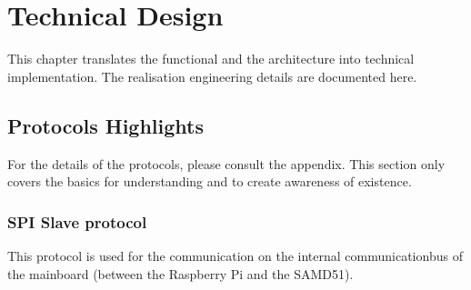 \chapter{Technical Design}
This chapter translates the functional and the architecture into technical implementation. The realisation engineering details are documented here. 

\section{Protocols Highlights}
For the details of the protocols, please consult the appendix. This section only covers the basics for understanding and to create awareness of existence.  \\
\subsection{SPI Slave protocol}
This protocol is used for the communication on the internal communicationbus of the mainboard (between the Raspberry Pi and the SAMD51).\\
